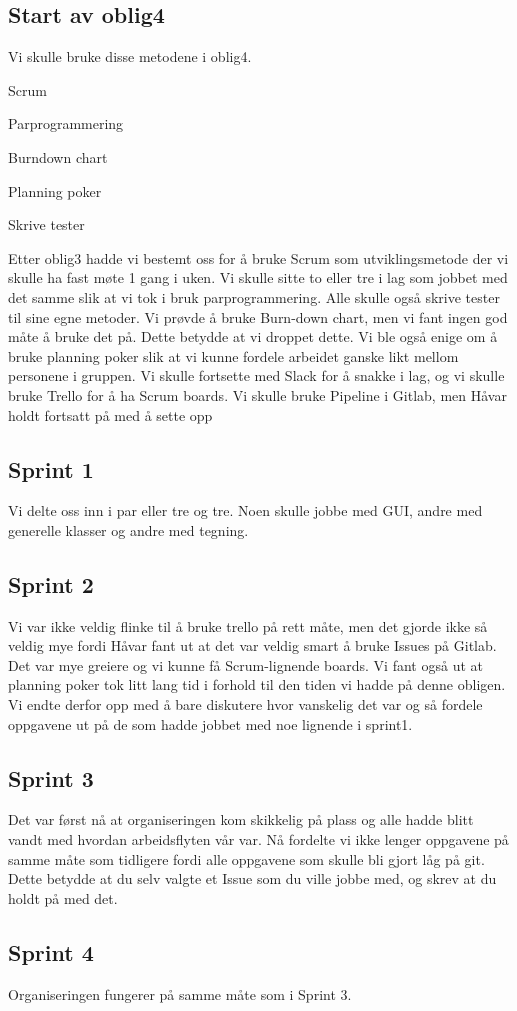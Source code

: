 \documentclass[11pt]{meetingmins}
\begin{document}
\subsection{Start av oblig4}
Vi skulle bruke disse metodene i oblig4.
\begin{items}
\item Scrum
\item Parprogrammering
\item Burndown chart
\item Planning poker
\item Skrive tester
\end{items}

Etter oblig3 hadde vi bestemt oss for å bruke Scrum som utviklingsmetode der vi skulle ha fast møte 1 gang i uken. Vi skulle sitte to eller tre i lag som jobbet med det samme slik at vi tok i bruk parprogrammering. Alle skulle også skrive tester til sine egne metoder. Vi prøvde å bruke Burn-down chart, men vi fant ingen god måte å bruke det på. Dette betydde at vi droppet dette. Vi ble også enige om å bruke planning poker slik at vi kunne fordele arbeidet ganske likt mellom personene i gruppen. Vi skulle fortsette med Slack for å snakke i lag, og vi skulle bruke Trello for å ha Scrum boards. Vi skulle bruke Pipeline i Gitlab, men Håvar holdt fortsatt på med å sette opp 

\subsection{Sprint 1}
Vi delte oss inn i par eller tre og tre. Noen skulle jobbe med GUI, andre med generelle klasser og andre med tegning.

\subsection{Sprint 2}
Vi var ikke veldig flinke til å bruke trello på rett måte, men det gjorde ikke så veldig mye fordi Håvar fant ut at det var veldig smart å bruke Issues på Gitlab. Det var mye greiere og vi kunne få Scrum-lignende boards. Vi fant også ut at planning poker tok litt lang tid i forhold til den tiden vi hadde på denne obligen. Vi endte derfor opp med å bare diskutere hvor vanskelig det var og så fordele oppgavene ut på de som hadde jobbet med noe lignende i sprint1.

\subsection{Sprint 3}
Det var først nå at organiseringen kom skikkelig på plass og alle hadde blitt vandt med hvordan arbeidsflyten vår var. Nå fordelte vi ikke lenger oppgavene på samme måte som tidligere fordi alle oppgavene som skulle bli gjort låg på git. Dette betydde at du selv valgte et Issue som du ville jobbe med, og skrev at du holdt på med det. 

\subsection{Sprint 4}
Organiseringen fungerer på samme måte som i Sprint 3. 

\vspace{1em}
\end{document}
